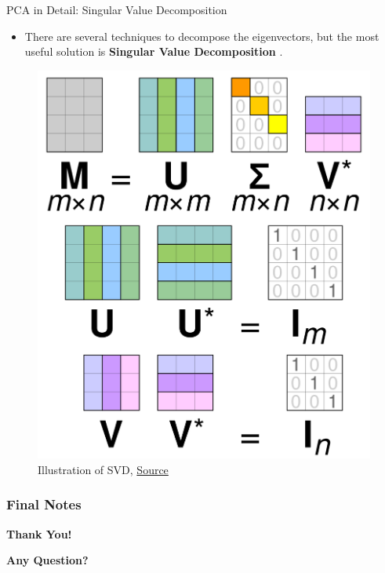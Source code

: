 \documentclass[compress,oilve]{beamer}
\newcommand{\tc}[2]{
 \textcolor{#1}{\textbf{#2}}
}
\begin{document}
\begin{frame}{PCA in Detail: Singular Value Decomposition}
\begin{itemize}
\item There are several techniques to decompose the eigenvectors, but the most useful solution is \tc{keywords}{Singular Value Decomposition}.
\end{itemize}
\begin{figure}
		\centering
		\includegraphics[scale=0.1]{4}
		\caption{Illustration of SVD, \href{	https://tinyurl.com/2q6ec2c6}{Source}}
	\end{figure}


\end{frame}




\frametitle{Final Notes}
\centering
\vspace{50 pt}
\textbf{Thank You!}
\vspace{50pt}

\textbf{Any Question?}
\end{document}
